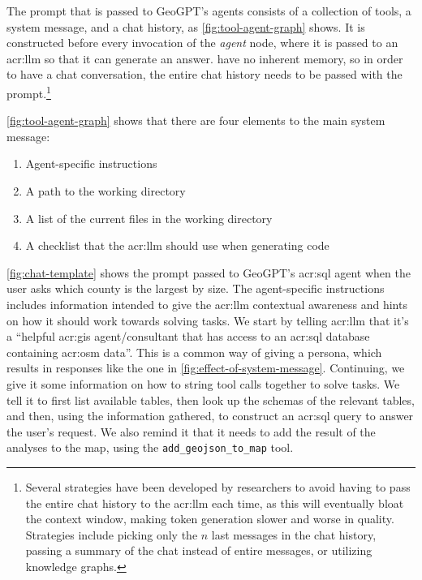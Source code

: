 The prompt that is passed to GeoGPT's agents consists of a collection of tools, a system message, and a chat history, as \autoref{fig:tool-agent-graph} shows. It is constructed before every invocation of the \textit{agent} node, where it is passed to an \acrshort{acr:llm} so that it can generate an answer.  have no inherent memory, so in order to have a chat conversation, the entire chat history needs to be passed with the prompt.\footnote{Several strategies have been developed by researchers to avoid having to pass the entire chat history to the \acrshort{acr:llm} each time, as this will eventually bloat the context window, making token generation slower and worse in quality. Strategies include picking only the $n$ last messages in the chat history, passing a summary of the chat instead of entire messages, or utilizing knowledge graphs.}

\autoref{fig:tool-agent-graph} shows that there are four elements to the main system message:

\begin{enumerate}
    \item Agent-specific instructions
    \item A path to the working directory
    \item A list of the current files in the working directory
    \item A checklist that the \acrshort{acr:llm} should use when generating code
\end{enumerate}

\autoref{fig:chat-template} shows the prompt passed to GeoGPT's \acrshort{acr:sql} agent when the user asks which county is the largest by size. The agent-specific instructions includes information intended to give the \acrshort{acr:llm} contextual awareness and hints on how it should work towards solving tasks. We start by telling \acrshort{acr:llm} that it's a \enquote{helpful \acrshort{acr:gis} agent/consultant that has access to an \acrshort{acr:sql} database containing \acrlong{acr:osm} data}. This is a common way of giving  a persona, which results in responses like the one in \autoref{fig:effect-of-system-message}. Continuing, we give it some information on how to string tool calls together to solve tasks. We tell it to first list available tables, then look up the schemas of the relevant tables, and then, using the information gathered, to construct an \acrshort{acr:sql} query to answer the user's request. We also remind it that it needs to add the result of the analyses to the map, using the \texttt{add\_geojson\_to\_map} tool.

